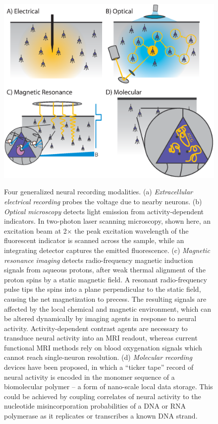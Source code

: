 \begin{figure}[htbp]
\caption{Four generalized neural recording modalities. (a) \emph{Extracellular electrical recording} probes the voltage due to nearby neurons. (b) \emph{Optical microscopy} detects light emission from activity-dependent indicators. In two-photon laser scanning microscopy, shown here, an excitation beam at 2$\times$ the peak excitation wavelength of the fluorescent indicator is scanned across the sample, while an integrating detector captures the emitted fluorescence. (c) \emph{Magnetic resonance imaging} detects radio-frequency magnetic induction signals from aqueous protons, after weak thermal alignment of the proton spins by a static magnetic field. A resonant radio-frequency pulse tips the spins into a plane perpendicular to the static field, causing the net magnetization to precess. The resulting signals are affected by the local chemical and magnetic environment, which can be altered dynamically by imaging agents in response to neural activity. Activity-dependent contrast agents are necessary to transduce neural activity into an MRI readout, whereas current functional MRI methods rely on blood oxygenation signals which cannot reach single-neuron resolution. (d) \emph{Molecular recording} devices have been proposed, in which a “ticker tape” record of neural activity is encoded in the monomer sequence of a biomolecular polymer – a form of nano-scale local data storage. This could be achieved by coupling correlates of neural activity to the nucleotide misincorporation probabilities of a DNA or RNA polymerase as it replicates or transcribes a known DNA strand.} 
\centering
\includegraphics[width=0.8\linewidth]{figs/Fig1.eps}
\label{fig:modalities}
\end{figure}

